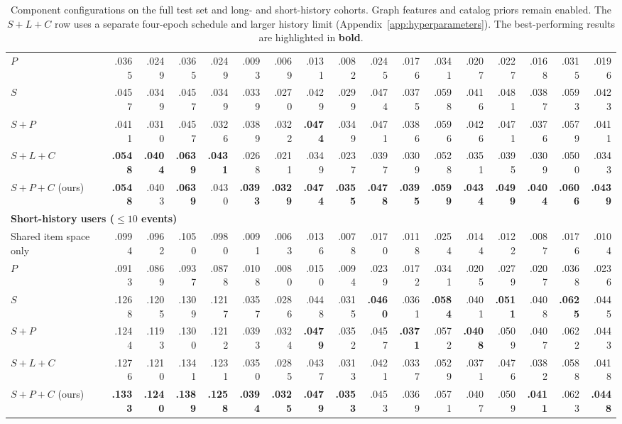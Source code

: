 ﻿\documentclass[sigconf,anonymous,review]{acmart}
\begin{document}
\begin{table}[!tbp]
{\begin{tabular}{l*{4}{rrrr}}
        $P$ & .0365 & .0249 & .0365 & .0249 & .0093 & .0069 & .0131 & .0082 & .0245 & .0176 & .0341 & .0207 & .0227 & .0168 & .0315 & .0196 \\
        $S$ & .0457 & .0349 & .0457 & .0349 & .0339 & .0270 & .0429 & .0299 & .0474 & .0375 & .0598 & .0416 & .0481 & .0387 & .0593 & .0423 \\
        $S+P$ & .0411 & .0310 & .0457 & .0326 & .0389 & .0322 & \textbf{.0474} & .0349 & .0471 & .0386 & .0596 & .0426 & .0471 & .0376 & .0579 & .0411 \\
        $S+L+C$ & \textbf{.0548} & \textbf{.0404} & \textbf{.0639} & \textbf{.0431} & .0268 & .0211 & .0349 & .0237 & .0397 & .0309 & .0528 & .0351 & .0395 & .0309 & .0500 & .0343 \\
        $S+P+C$ (ours) & \textbf{.0548} & .0403 & \textbf{.0639} & .0430 & \textbf{.0393} & \textbf{.0329} & \textbf{.0474} & \textbf{.0355} & \textbf{.0478} & \textbf{.0395} & \textbf{.0599} & \textbf{.0434} & \textbf{.0499} & \textbf{.0404} & \textbf{.0606} & \textbf{.0439} \\
        \midrule
        \multicolumn{17}{l}{\textbf{Short-history users ($\leq10$ events)}} \\
        Shared item space only & .0994 & .0962 & .1050 & .0980 & .0091 & .0063 & .0136 & .0078 & .0170 & .0118 & .0254 & .0144 & .0122 & .0087 & .0176 & .0104 \\
        $P$ & .0913 & .0869 & .0937 & .0878 & .0108 & .0080 & .0150 & .0094 & .0239 & .0172 & .0341 & .0205 & .0279 & .0207 & .0368 & .0236 \\
        $S$ & .1268 & .1205 & .1309 & .1217 & .0357 & .0286 & .0448 & .0315 & \textbf{.0460} & .0361 & \textbf{.0584} & .0401 & \textbf{.0511} & .0408 & \textbf{.0625} & .0445 \\
        $S+P$ & .1244 & .1193 & .1300 & .1212 & .0393 & .0324 & \textbf{.0479} & .0352 & .0457 & \textbf{.0371} & .0572 & \textbf{.0408} & .0509 & .0407 & .0622 & .0443 \\
        $S+L+C$ & .1276 & .1210 & .1341 & .1231 & .0350 & .0285 & .0437 & .0313 & .0421 & .0337 & .0529 & .0371 & .0476 & .0382 & .0588 & .0418 \\
        $S+P+C$ (ours) & \textbf{.1333} & \textbf{.1240} & \textbf{.1389} & \textbf{.1258} & \textbf{.0394} & \textbf{.0325} & \textbf{.0479} & \textbf{.0353} & .0453 & .0369 & .0571 & .0407 & .0509 & \textbf{.0411} & .0623 & \textbf{.0448} \\
        \bottomrule
    \end{tabular}%
    }
    \caption{Component configurations on the full test set and long- and short-history cohorts. Graph features and catalog priors remain enabled. The $S+L+C$ row uses a separate four-epoch schedule and larger history limit (Appendix~\ref{app:hyperparameters}). The best-performing results are highlighted in \textbf{bold}.}
    \label{tab:amazon2023_main}
    \vspace{-0.3cm}
\end{table}
\end{document}
